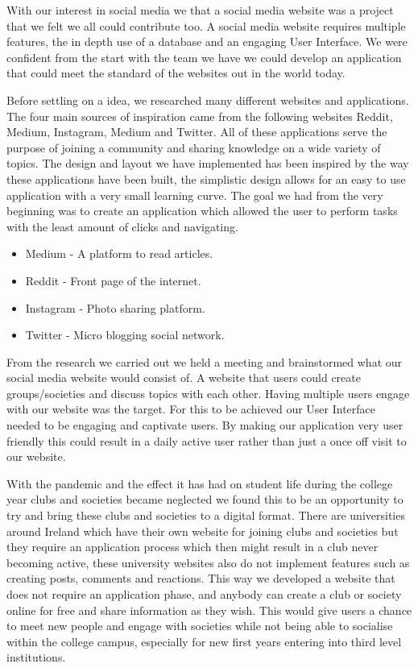 With our interest in social media we that a social media website was a project that we felt we all could contribute too. A social media website requires multiple features, the in depth use of a database and an engaging User Interface. We were confident from the start with the team we have we could develop an application that could meet the standard of the websites out in the world today.
\newline

Before settling on a idea, we researched many different websites and applications.
The four main sources of inspiration came from the following websites Reddit, Medium, Instagram, Medium and Twitter. All of these applications serve the purpose of joining a community and sharing knowledge on a wide variety of topics. The design and layout we have implemented has been inspired by the way these applications have been built, the simplistic design allows for an easy to use application with a very small learning curve. The goal we had from the very beginning was to create an application which allowed the user to perform tasks with the least amount of clicks and navigating.
\begin{itemize}
\item Medium - A platform to read articles.
\item Reddit - Front page of the internet.
\item Instagram - Photo sharing platform.
\item Twitter - Micro blogging social network.
\end{itemize}

From the research we carried out we held a meeting and brainstormed what our social media website would consist of. A website that users could create groups/societies and discuss topics with each other. Having multiple users engage with our website was the target. For this to be achieved our User Interface needed to be engaging and captivate users. By making our application very user friendly this could result in a daily active user rather than just a once off visit to our website.
\newline 

With the pandemic and the effect it has had on student life during the college year clubs and societies became neglected we found this to be an opportunity to try and bring these clubs and societies to a digital format. There are universities around Ireland which have their own website for joining clubs and societies but they require an application process which then might result in a club never becoming active, these university websites also do not implement features such as creating posts, comments and reactions. This way we developed a website that does not require an application phase, and anybody can create a club or society online for free and share information as they wish. This would give users a chance to meet new people and engage with societies while not being able to socialise within the college campus, especially for new first years entering into third level institutions.
\newline

